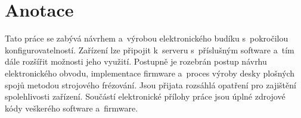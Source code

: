 \section*{Anotace}
Tato práce se zabývá návrhem a~výrobou elektronického budíku s~pokročilou
konfigurovatelností. Zařízení lze připojit k~serveru s~příslušným software
a~tím dále rozšířit možnosti jeho využití. Postupně je rozebrán postup návrhu
elektronického obvodu, implementace firmware a~proces výroby desky plošných
spojů metodou strojového frézování. Jsou přijata rozsáhlá opatření pro
zajištění spolehlivosti zařízení. Součástí elektronické přílohy práce jsou
úplné zdrojové kódy veškerého software a~firmware.
